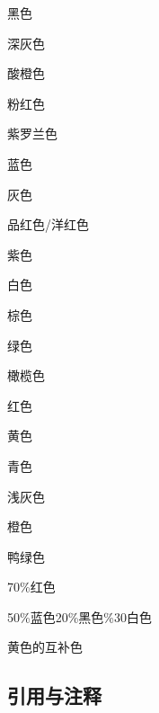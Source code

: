 \documentclass{ctexart}
\begin{document}
            {\color{black}黑色}
            
            {\color{darkgray}深灰色}

            {\color{lime}酸橙色}

            {\color{pink}粉红色}

            {\color{violet}紫罗兰色}

            {\color{blue}蓝色}

            {\color{gray}灰色}

            {\color{magenta}品红色/洋红色}

            {\color{purple}紫色}

            {\color{white}白色}

            {\color{brown}棕色}

            {\color{green}绿色}

            {\color{olive}橄榄色}

            {\color{red}红色}

            {\color{yellow}黄色}

            {\color{cyan}青色}

            {\color{lightgray}浅灰色}

            {\color{orange}橙色}

            {\color{teal}鸭绿色}

            \textcolor{red!70}{70\%红色}

            \textcolor{blue!50!black!20!white}{50\%蓝色20\%黑色\%30白色}

            \textcolor{-yellow}{黄色的互补色}

    \subsection{引用与注释}
\end{document}
